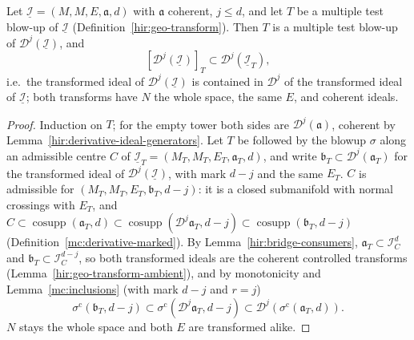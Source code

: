 \begin{lemma}
\label{mc:inclusions-tower}
\leanok
Let \(\underline{\mathcal I}=(M,M,E,\mathfrak a,d)\) with \(\mathfrak a\) coherent, \(j\le d\), and let \(T\) be a multiple test blow-up of \(\underline{\mathcal I}\)
(Definition~\ref{hir:geo-transform}). Then \(T\) is a multiple test blow-up of \(\mathcal D^j(\underline{\mathcal I})\), and
\[
 [\mathcal D^j(\underline{\mathcal I})]_T\subset\mathcal D^j(\underline{\mathcal I}_T),
\]
i.e.\ the transformed ideal of \(\mathcal D^j(\underline{\mathcal I})\) is contained in \(\mathcal D^j\) of the transformed ideal of \(\underline{\mathcal I}\); both transforms
have \(N\) the whole space, the same \(E\), and coherent ideals.
\end{lemma}
\begin{proof}
\leanok
Induction on \(T\); for the empty tower both sides are \(\mathcal D^j(\mathfrak a)\), coherent by Lemma~\ref{hir:derivative-ideal-generators}. Let \(T\) be followed by
the blowup \(\sigma\) along an admissible centre \(C\) of \(\underline{\mathcal I}_T=(M_T,M_T,E_T,\mathfrak a_T,d)\), and write
\(\mathfrak b_T\subset\mathcal D^j(\mathfrak a_T)\) for the transformed ideal of \(\mathcal D^j(\underline{\mathcal I})\), with mark \(d-j\) and the same \(E_T\).
\(C\) is admissible for \((M_T,M_T,E_T,\mathfrak b_T,d-j)\): it is a closed submanifold with normal crossings with \(E_T\), and
\(C\subset\operatorname{cosupp}(\mathfrak a_T,d)\subset\operatorname{cosupp}(\mathcal D^j\mathfrak a_T,d-j)\subset\operatorname{cosupp}(\mathfrak b_T,d-j)\)
(Definition~\ref{mc:derivative-marked}). By Lemma~\ref{hir:bridge-consumers}, \(\mathfrak a_T\subset\mathcal I_C^{d}\) and \(\mathfrak b_T\subset\mathcal I_C^{d-j}\), so both
transformed ideals are the coherent controlled transforms (Lemma~\ref{hir:geo-transform-ambient}), and by monotonicity and
Lemma~\ref{mc:inclusions} (with mark \(d-j\) and \(r=j\))
\[
 \sigma^{\mathrm c}(\mathfrak b_T,d-j)\subset\sigma^{\mathrm c}(\mathcal D^j\mathfrak a_T,d-j)\subset\mathcal D^j(\sigma^{\mathrm c}(\mathfrak a_T,d)).
\]
\(N\) stays the whole space and both \(E\) are transformed alike.
\end{proof}

